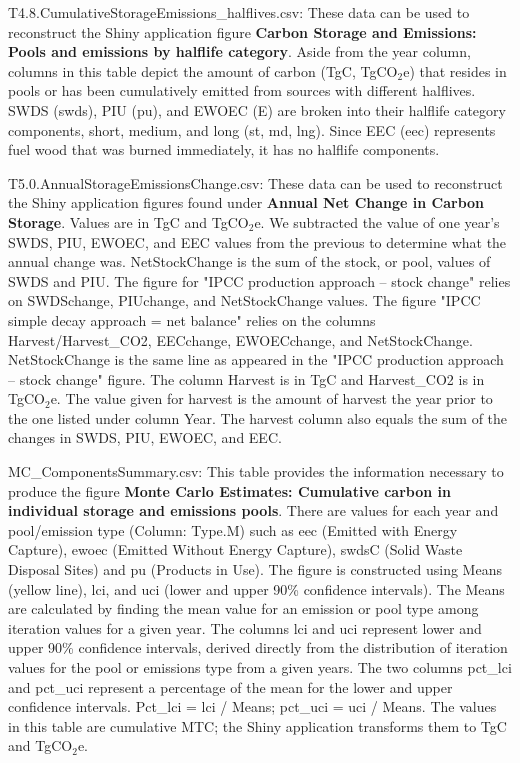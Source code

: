 \documentclass[
  openany]{book}
\begin{document}
T4.8.CumulativeStorageEmissions\_halflives.csv: These data can be used
to reconstruct the Shiny application figure \textbf{Carbon Storage and
Emissions: Pools and emissions by halflife category}. Aside from the
year column, columns in this table depict the amount of carbon (TgC,
TgCO\(_2\)e) that resides in pools or has been cumulatively emitted from
sources with different halflives. SWDS (swds), PIU (pu), and EWOEC (E)
are broken into their halflife category components, short, medium, and
long (st, md, lng). Since EEC (eec) represents fuel wood that was burned
immediately, it has no halflife components.

T5.0.AnnualStorageEmissionsChange.csv: These data can be used to
reconstruct the Shiny application figures found under \textbf{Annual Net
Change in Carbon Storage}. Values are in TgC and TgCO\(_2\)e. We
subtracted the value of one year's SWDS, PIU, EWOEC, and EEC values from
the previous to determine what the annual change was. NetStockChange is
the sum of the stock, or pool, values of SWDS and PIU. The figure for
"IPCC production approach -- stock change" relies on SWDSchange,
PIUchange, and NetStockChange values. The figure "IPCC simple decay
approach = net balance" relies on the columns Harvest/Harvest\_CO2,
EECchange, EWOECchange, and NetStockChange. NetStockChange is the same
line as appeared in the "IPCC production approach -- stock change"
figure. The column Harvest is in TgC and Harvest\_CO2 is in TgCO\(_2\)e.
The value given for harvest is the amount of harvest the year prior to
the one listed under column Year. The harvest column also equals the sum
of the changes in SWDS, PIU, EWOEC, and EEC.

MC\_ComponentsSummary.csv: This table provides the information necessary
to produce the figure \textbf{Monte Carlo Estimates: Cumulative carbon
in individual storage and emissions pools}. There are values for each
year and pool/emission type (Column: Type.M) such as eec (Emitted with
Energy Capture), ewoec (Emitted Without Energy Capture), swdsC (Solid
Waste Disposal Sites) and pu (Products in Use). The figure is
constructed using Means (yellow line), lci, and uci (lower and upper
90\% confidence intervals). The Means are calculated by finding the mean
value for an emission or pool type among iteration values for a given
year. The columns lci and uci represent lower and upper 90\% confidence
intervals, derived directly from the distribution of iteration values
for the pool or emissions type from a given years. The two columns
pct\_lci and pct\_uci represent a percentage of the mean for the lower
and upper confidence intervals. Pct\_lci = lci / Means; pct\_uci = uci /
Means. The values in this table are cumulative MTC; the Shiny
application transforms them to TgC and TgCO\(_2\)e.
\end{document}
